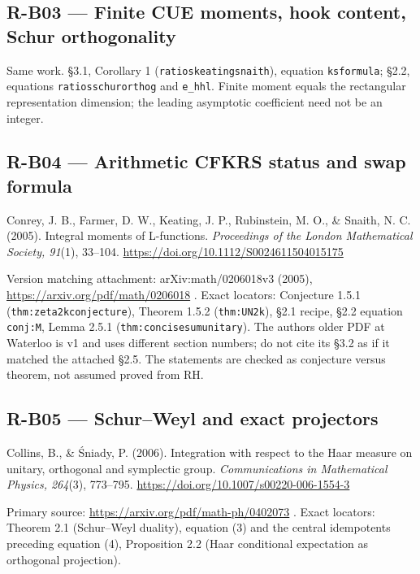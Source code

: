 \documentclass[11pt,a4paper]{article}
\theoremstyle{definition}\newtheorem{definition}{Definition}
\begin{document}
\subsection{R-B03 --- Finite CUE moments, hook content, Schur
orthogonality}\label{r-b03--finite-cue-moments-hook-content-schur-orthogonality}

Same work. §3.1, Corollary 1 (\nolinkurl{ratioskeatingsnaith}), equation
\nolinkurl{ksformula}; §2.2, equations \nolinkurl{ratiosschurorthog} and
\nolinkurl{e_hhl}. Finite moment equals the rectangular representation
dimension; the leading asymptotic coefficient need not be an integer.

\subsection{R-B04 --- Arithmetic CFKRS status and swap
formula}\label{r-b04--arithmetic-cfkrs-status-and-swap-formula}

Conrey, J. B., Farmer, D. W., Keating, J. P., Rubinstein, M. O., \&
Snaith, N. C. (2005). Integral moments of L-functions. \emph{Proceedings
of the London Mathematical Society, 91}(1), 33--104.
\url{https://doi.org/10.1112/S0024611504015175}

Version matching attachment: arXiv:math/0206018v3 (2005),
\url{https://arxiv.org/pdf/math/0206018} . Exact locators: Conjecture
1.5.1 (\nolinkurl{thm:zeta2kconjecture}), Theorem 1.5.2
(\nolinkurl{thm:UN2k}), §2.1 recipe, §2.2 equation \nolinkurl{conj:M}, Lemma
2.5.1 (\nolinkurl{thm:concisesumunitary}). The author\textquotesingle s
older PDF at Waterloo is v1 and uses different section numbers; do not
cite its §3.2 as if it matched the attached §2.5. The statements are
checked as conjecture versus theorem, not assumed proved from RH.

\subsection{R-B05 --- Schur--Weyl and exact
projectors}\label{r-b05--schurweyl-and-exact-projectors}

Collins, B., \& Śniady, P. (2006). Integration with respect to the Haar
measure on unitary, orthogonal and symplectic group.
\emph{Communications in Mathematical Physics, 264}(3), 773--795.
\url{https://doi.org/10.1007/s00220-006-1554-3}

Primary source: \url{https://arxiv.org/pdf/math-ph/0402073} . Exact
locators: Theorem 2.1 (Schur--Weyl duality), equation (3) and the
central idempotents preceding equation (4), Proposition 2.2 (Haar
conditional expectation as orthogonal projection).
\end{document}
